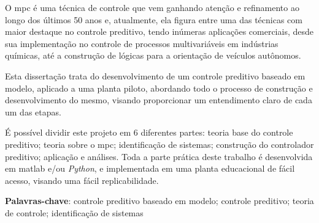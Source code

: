 
\setlength{\absparsep}{18pt} %
\begin{resumo}
    O \acrshort{mpc} é uma técnica de controle que vem ganhando atenção e refinamento
    ao longo dos últimos 50 anos e, atualmente, ela figura entre uma das técnicas
    com maior destaque no controle preditivo, tendo inúmeras aplicações comerciais,
    desde sua implementação no controle de processos multivariáveis em indústrias químicas,
    até a construção de lógicas para a orientação de veículos autônomos.

    Esta dissertação trata do desenvolvimento de um controle preditivo baseado em modelo,
    aplicado a uma planta piloto, abordando todo o processo de construção e desenvolvimento
    do mesmo, visando proporcionar um entendimento claro de cada um das etapas.

    É possível dividir este projeto em 6 diferentes partes: teoria base do controle
    preditivo; teoria sobre o \acrshort{mpc}; identificação de sistemas; construção do
    controlador preditivo; aplicação e análises. Toda a parte prática deste trabalho é
    desenvolvida em \acrshort{matlab} e/ou \textit{Python}, e implementada em uma
    planta educacional de fácil acesso, visando uma fácil replicabilidade.
    
    \vspace{\onelineskip}

    \noindent 
    \textbf{Palavras-chave}: controle preditivo baseado em modelo; controle preditivo; teoria de controle; identificação de sistemas
\end{resumo}